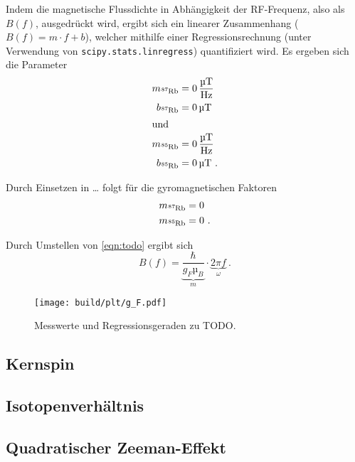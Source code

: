 Indem die magnetische Flussdichte in Abhängigkeit der RF-Frequenz, also als $B(f)$, ausgedrückt wird,
ergibt sich ein linearer Zusammenhang ($B(f) = m·f+b$),
welcher mithilfe einer Regressionsrechnung
(unter Verwendung von \texttt{scipy.stats.linregress})
quantifiziert wird.
Es ergeben sich die Parameter
\begin{align*}
    m_{\Rb{87}} &= \SI{0}{\micro\tesla\per\hertz} \\
    b_{\Rb{87}} &= \SI{0}{\micro\tesla} \\
    \intertext{und}
    m_{\Rb{85}} &= \SI{0}{\micro\tesla\per\hertz} \\
    b_{\Rb{85}} &= \SI{0}{\micro\tesla} \ .
\end{align*}

Durch Einsetzen in … folgt für die gyromagnetischen Faktoren
\begin{align*}
    m_{\Rb{87}} &= \SI{0}{} \\
    m_{\Rb{85}} &= \SI{0}{} \ .
\end{align*}

Durch Umstellen von \autoref{eqn:todo} ergibt sich
\begin{equation*}
    B(f) = \underbrace{\frac{\hbar}{g_F µ_B}}_m · \underbrace{2\pi f}_\omega \ .
\end{equation*}

\begin{figure}
    \centering
    \texttt{[image: build/plt/g\_F.pdf]}
    \caption{Messwerte und Regressionsgeraden zu TODO.}
    \label{fig:plt:g_F}
\end{figure}


\subsection{Kernspin}


\subsection{Isotopenverhältnis}


\subsection{Quadratischer Zeeman-Effekt}
